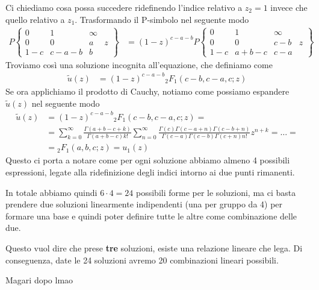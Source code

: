 Ci chiediamo cosa possa succedere ridefinendo l'indice relativo a $z_2=1$ invece che quello relativo a $z_1$.
Trasformando il P-simbolo nel seguente modo
\begin{align}
	P\left\{\begin{matrix}
		0   & 1     & \infty & \\
		0   & 0     & a      & z\\
		1-c & c-a-b & b      & 
	\end{matrix}\right\} &= (1-z)^{c-a-b} P\left\{\begin{matrix}
		0   & 1     & \infty & \\
		0 	& 0     & c-b  & z\\
		1-c & a+b-c & c-a  & 
	\end{matrix}\right\}
\end{align}
Troviamo così una soluzione incognita all'equazione, che definiamo come
\begin{align}
	\tilde{u}(z) &= (1-z)^{c-a-b} {}_2F_1(c-b,c-a,c; z)
\end{align}
Se ora applichiamo il prodotto di Cauchy, notiamo come possiamo espandere $\tilde{u}(z)$ nel seguente modo
\begin{align}
	\tilde{u}(z) &= (1-z)^{c-a-b} {}_2F_1(c-b,c-a,c; z) = \nonumber\\
				 &= \sum_{k=0}^{\infty} \frac{\Gamma(a+b-c+k)}{\Gamma(a+b-c) k!}\sum_{n=0}^{\infty} \frac{\Gamma(c)\Gamma (c-a+n)\Gamma (c-b+n)}{\Gamma (c-a)\Gamma (c-b)\Gamma (c+n)n!}z^{n+k} =\dots= \nonumber\\
				 &= {}_2F_1(a,b,c; z) = u_1(z)
\end{align}
Questo ci porta a notare come per ogni soluzione abbiamo almeno 4 possibili espressioni, legate alla ridefinizione degli indici intorno ai due punti rimanenti.

In totale abbiamo quindi $6\cdot4=24$ possibili forme per le soluzioni, ma ci basta prendere due soluzioni linearmente indipendenti (una per gruppo da 4) per formare una base e quindi poter definire tutte le altre come combinazione delle due.

Questo vuol dire che prese \textbf{tre} soluzioni, esiste una relazione lineare che lega. Di conseguenza, date le 24 soluzioni avremo 20 combinazioni lineari possibili.

Magari dopo lmao

\newpage

